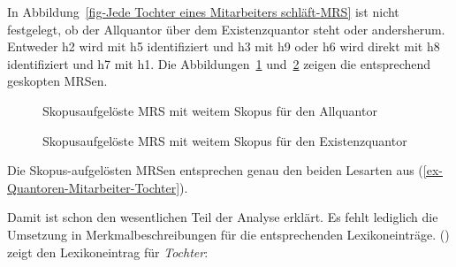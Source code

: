 In Abbildung~\ref{fig-Jede Tochter eines Mitarbeiters
  schläft-MRS} ist nicht festgelegt, ob der Allquantor über dem Existenzquantor steht oder
andersherum. Entweder h2 wird mit h5
identifiziert und h3 mit h9 oder h6 wird direkt mit h8 identifiziert und h7 mit h1. Die Abbildungen~\ref{fig-Jede-Tochter-eines-Mitarbeiters-schläft-Allquantor} und~\ref{fig-Jede-Tochter-eines-Mitarbeiters-schläft-Existenzquantor} zeigen die entsprechend geskopten MRSen.
\begin{figure}
\caption{Skopusaufgelöste MRS mit weitem Skopus für den Allquantor}\label{fig-Jede-Tochter-eines-Mitarbeiters-schläft-Allquantor}
\end{figure}
\begin{figure}
\caption{Skopusaufgelöste MRS mit weitem Skopus für den Existenzquantor}\label{fig-Jede-Tochter-eines-Mitarbeiters-schläft-Existenzquantor}
\end{figure}
Die Skopus-aufgelösten MRSen entsprechen genau den beiden Lesarten aus (\ref{ex-Quantoren-Mitarbeiter-Tochter}).

Damit ist schon den wesentlichen Teil der Analyse erklärt. Es fehlt lediglich die Umsetzung
in Merkmalbeschreibungen für die entsprechenden Lexikoneinträge. 
() zeigt den Lexikoneintrag für \emph{Tochter}:

